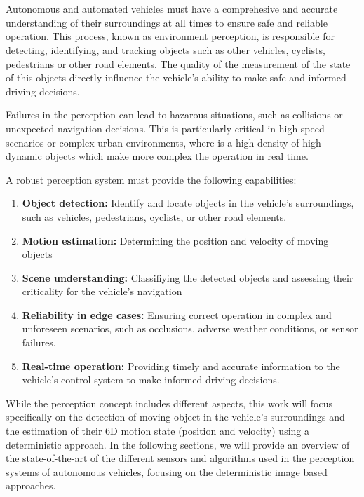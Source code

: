 \section{}

Autonomous and automated vehicles must have a comprehesive and accurate understanding of their surroundings at 
all times to ensure safe and reliable operation. This process, known as environment perception, is responsible
for detecting, identifying, and tracking objects such as other vehicles, cyclists, pedestrians or other
road elements. The quality of the measurement of the state of this objects directly influence the vehicle's
ability to make safe and informed driving decisions. 

Failures in the perception can lead to hazarous situations, such as collisions or unexpected navigation decisions.
This is particularly critical in high-speed scenarios or complex urban environments, where is a high density of
high dynamic objects which make more complex the operation in real time. 

A robust perception system must provide the following capabilities:

\begin{enumerate}
  \item \textbf{Object detection:} Identify and locate objects in the vehicle's surroundings, such as vehicles, pedestrians, cyclists, or other road elements.
  \item \textbf{Motion estimation:} Determining the position and velocity of moving objects
  \item \textbf{Scene understanding:} Classifiying the detected objects and assessing their criticality for the vehicle's navigation
  \item \textbf{Reliability in edge cases:} Ensuring correct operation in complex and unforeseen scenarios, such as occlusions, adverse weather conditions, or sensor failures.
  \item \textbf{Real-time operation:} Providing timely and accurate information to the vehicle's control system to make informed driving decisions.
\end{enumerate}

While the perception concept includes different aspects, this work will focus specifically on the detection of 
moving object in the vehicle's surroundings and the estimation of their 6D motion state (position and velocity) 
using a deterministic approach. In the following sections, we will provide an overview of the state-of-the-art of
the different sensors and algorithms used in the perception systems of autonomous vehicles, focusing on the deterministic image
based approaches.

